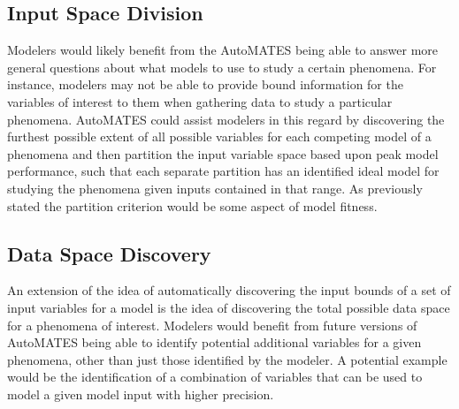 \subsection{Input Space Division\label{sec:auto_isd}}
Modelers would likely benefit from the AutoMATES being able to answer more general questions about what models to use to study a certain phenomena. For instance, modelers may not be able to provide bound information for the variables of interest to them when gathering data to study a particular phenomena. AutoMATES could assist modelers in this regard by discovering the furthest possible extent of all possible variables for each competing model of a phenomena and then partition the input variable space based upon peak model performance, such that each separate partition has an identified ideal model for studying the phenomena given inputs contained in that range. As previously stated the partition criterion would be some aspect of model fitness.

\subsection{Data Space Discovery\label{sec:auto_dsd}}
An extension of the idea of automatically discovering the input bounds of a set of input variables for a model is the idea of discovering the total possible data space for a phenomena of interest. Modelers would benefit from future versions of AutoMATES being able to identify potential additional variables for a given phenomena, other than just those identified by the modeler. A potential example would be the identification of a combination of variables that can be used to model a given model input with higher precision.
